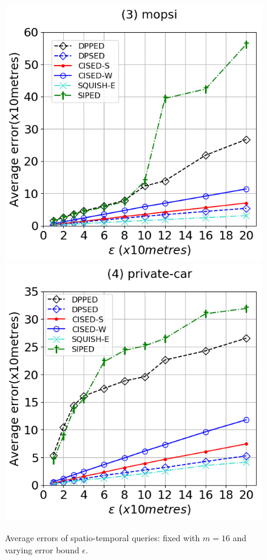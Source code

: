 {\begin{figure}[tb!]
\includegraphics[scale = 0.295]{Figures/Exp-query-ae-epsilon-mopsi.png}\hspace{1ex}
\includegraphics[scale = 0.295]{Figures/Exp-query-ae-epsilon-private.png}
\caption{\small Average errors of spatio-temporal queries: fixed with $m=16$ and varying error bound $\epsilon$.}
\label{fig:query-ae}
\end{figure}


}
